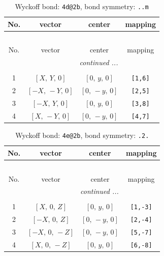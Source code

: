 \documentclass[fleqn,8pt]{jsarticle}
\begin{document}
\begin{longtable}{cccc}
\caption{Wyckoff bond: {\tt 4d@2b}, bond symmetry: {\tt ..m}}
 \\
 \hline \hline
No. & vector & center & mapping \\ \hline \endfirsthead

\multicolumn{3}{l}{\tablename\ \thetable{}} \\
 \hline \hline
No. & vector & center & mapping \\ \hline \endhead

 \hline \hline
\multicolumn{3}{r}{\footnotesize\it continued ...} \\ \endfoot

 \hline \hline
\multicolumn{3}{r}{} \\ \endlastfoot

1 & $\left[ X,\, Y,\, 0 \right]$ & $\left[ 0,\, y,\, 0 \right]$ & {\tt [1,6]} \\ \hline
2 & $\left[ - X,\, - Y,\, 0 \right]$ & $\left[ 0,\, - y,\, 0 \right]$ & {\tt [2,5]} \\ \hline
3 & $\left[ - X,\, Y,\, 0 \right]$ & $\left[ 0,\, y,\, 0 \right]$ & {\tt [3,8]} \\ \hline
4 & $\left[ X,\, - Y,\, 0 \right]$ & $\left[ 0,\, - y,\, 0 \right]$ & {\tt [4,7]} \\
\end{longtable}
\renewcommand{\arraystretch}{1.2}
\begin{longtable}{cccc}
\caption{Wyckoff bond: {\tt 4e@2b}, bond symmetry: {\tt .2.}}
 \\
 \hline \hline
No. & vector & center & mapping \\ \hline \endfirsthead

\multicolumn{3}{l}{\tablename\ \thetable{}} \\
 \hline \hline
No. & vector & center & mapping \\ \hline \endhead

 \hline \hline
\multicolumn{3}{r}{\footnotesize\it continued ...} \\ \endfoot

 \hline \hline
\multicolumn{3}{r}{} \\ \endlastfoot

1 & $\left[ X,\, 0,\, Z \right]$ & $\left[ 0,\, y,\, 0 \right]$ & {\tt [1,-3]} \\ \hline
2 & $\left[ - X,\, 0,\, Z \right]$ & $\left[ 0,\, - y,\, 0 \right]$ & {\tt [2,-4]} \\ \hline
3 & $\left[ - X,\, 0,\, - Z \right]$ & $\left[ 0,\, - y,\, 0 \right]$ & {\tt [5,-7]} \\ \hline
4 & $\left[ X,\, 0,\, - Z \right]$ & $\left[ 0,\, y,\, 0 \right]$ & {\tt [6,-8]} \\
\end{longtable}
\end{document}
